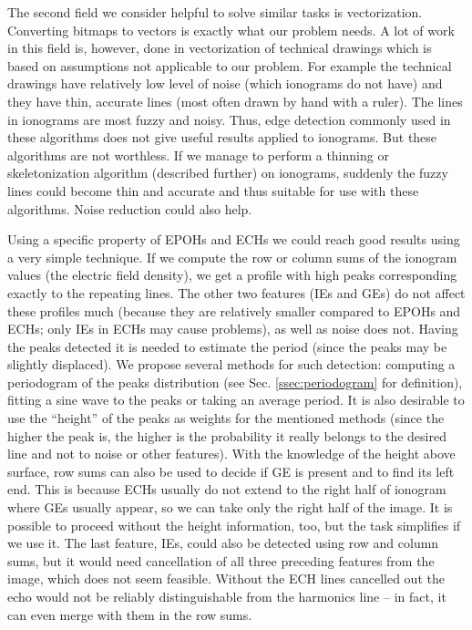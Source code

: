 The second field we consider helpful to solve similar tasks is vectorization. Converting bitmaps to vectors is exactly what our problem needs. A lot of work in this field is, however, done in vectorization of technical drawings which is based on assumptions not applicable to our problem. For example the technical drawings have relatively low level of noise (which ionograms do not have) and they have thin, accurate lines (most often drawn by hand with a ruler). The lines in ionograms are most fuzzy and noisy. Thus, edge detection commonly used in these algorithms does not give useful results applied to ionograms. But these algorithms are not worthless. If we manage to perform a thinning or skeletonization algorithm (described further) on ionograms, suddenly the fuzzy lines could become thin and accurate and thus suitable for use with these algorithms. Noise reduction could also help.

Using a specific property of EPOHs and ECHs we could reach good results using a very simple technique. If we compute the row or column sums of the ionogram values (the electric field density), we get a profile with high peaks corresponding exactly to the repeating lines. The other two features (IEs and GEs) do not affect these profiles much (because they are relatively smaller compared to EPOHs and ECHs; only IEs in ECHs may cause problems), as well as noise does not. Having the peaks detected it is needed to estimate the period (since the peaks may be slightly displaced). We propose several methods for such detection: computing a periodogram of the peaks distribution (see Sec. \ref{ssec:periodogram} for definition), fitting a sine wave to the peaks or taking an average period. It is also desirable to use the ``height'' of the peaks as weights for the mentioned methods (since the higher the peak is, the higher is the probability it really belongs to the desired line and not to noise or other features). With the knowledge of the height above surface, row sums can also be used to decide if GE is present and to find its left end. This is because ECHs usually do not extend to the right half of ionogram where GEs usually appear, so we can take only the right half of the image. It is possible to proceed without the height information, too, but the task simplifies if we use it. The last feature, IEs, could also be detected using row and column sums, but it would need cancellation of all three preceding features from the image, which does not seem feasible. Without the ECH lines cancelled out the echo would not be reliably distinguishable from the harmonics line -- in fact, it can even merge with them in the row sums.

